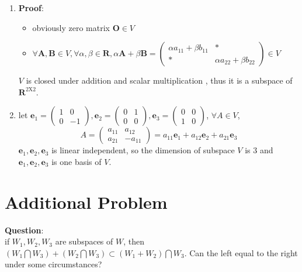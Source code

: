 \documentclass[12pt,a4paper]{article}
\begin{document}
\begin{enumerate}[(1)]
\item \textbf{Proof}: 
\begin{itemize}
	\item obviously zero matrix $\bm O \in {V}$ 
	\item $\forall \bm{A},\bm{B} \in {V},\forall \alpha,\beta \in \mathbf{R},
		\alpha \bm{A} + \beta \bm{B} = \left(
		\begin{array}{cc}
		 \alpha a_{11} + \beta b_{11} & * \\
		 * & \alpha a_{22} + \beta b_{22}
		\end{array} 
		\right) \in {V}
	$
\end{itemize}
${V}$ is closed under addition and scalar multiplication ,
thus it is a subspace of $\mathbf{R}^{2\text{X}2}$.
\item let $ 
\bm{e}_1 = \left(
	\begin{array}{cc}
	 1 & 0  \\
	 0 & -1  
	\end{array} 
\right),
\bm{e}_2 = \left(
\begin{array}{cc}
0 & 1  \\
0 & 0  
\end{array} 
\right),
\bm{e}_3 = \left(
\begin{array}{cc}
0 & 0  \\
1 & 0  
\end{array} 
\right)
$,
$\forall A \in {V}$, \\
\[
A = \left( \begin{array}{cc}
a_{11} & a_{12} \\
a_{21} & -a_{11}
\end{array} \right) 
= a_{11}\bm{e}_1 + a_{12}\bm{e}_2 + 
a_{21}\bm{e}_3
\]
$\bm{e}_1,\bm{e}_2,\bm{e}_3$ is linear independent,
so the dimension of subspace ${V}$ is 3
and $\bm{e}_1,\bm{e}_2,\bm{e}_3$ is one basis of ${V}$.

\end{enumerate}
\section{Additional Problem}
\textbf{Question}: \\
if ${W}_1,{W}_2,{W}_3$ are subspaces of ${W}$, then 
$({W}_1 \bigcap {W}_3) + ({W}_2 \bigcap {W}_3) \subset ({W}_1 +{W}_2) \bigcap {W}_3$.
Can the left equal to the right under some circumstances?
 
\end{document}
